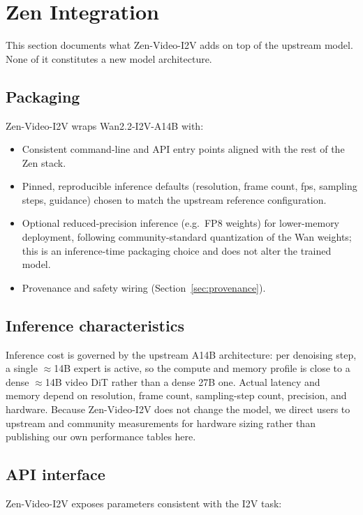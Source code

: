 \documentclass[11pt,a4paper]{article}
\begin{document}
\section{Zen Integration}

This section documents what Zen-Video-I2V adds on top of the upstream model. None of it constitutes a new model architecture.

\subsection{Packaging}

Zen-Video-I2V wraps Wan2.2-I2V-A14B with:

\begin{itemize}
  \item Consistent command-line and API entry points aligned with the rest of the Zen stack.
  \item Pinned, reproducible inference defaults (resolution, frame count, fps, sampling steps, guidance) chosen to match the upstream reference configuration.
  \item Optional reduced-precision inference (e.g.\ FP8 weights) for lower-memory deployment, following community-standard quantization of the Wan weights; this is an inference-time packaging choice and does not alter the trained model.
  \item Provenance and safety wiring (Section~\ref{sec:provenance}).
\end{itemize}

\subsection{Inference characteristics}

Inference cost is governed by the upstream A14B architecture: per denoising step, a single $\approx$14B expert is active, so the compute and memory profile is close to a dense $\approx$14B video DiT rather than a dense 27B one. Actual latency and memory depend on resolution, frame count, sampling-step count, precision, and hardware. Because Zen-Video-I2V does not change the model, we direct users to upstream and community measurements for hardware sizing rather than publishing our own performance tables here.

\subsection{API interface}

Zen-Video-I2V exposes parameters consistent with the I2V task:
\end{document}

